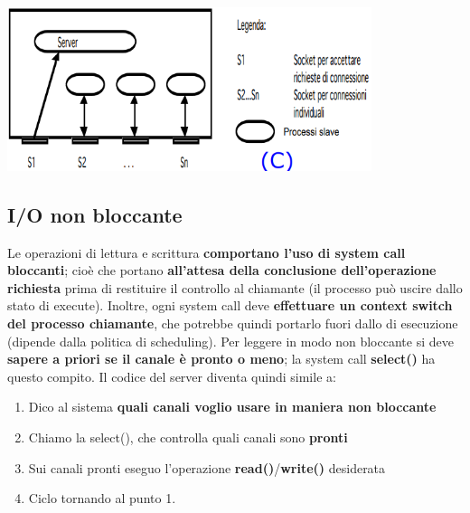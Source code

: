 \documentclass[12pt]{article}
\begin{document}
\begin{itemize}
\begin{itemize}
                    \begin{center}
                        \includegraphics[width = 0.80\textwidth]{Images/38.PNG}
                    \end{center}
          \end{itemize}
\end{itemize}
\subsection{I/O non bloccante}
Le operazioni di lettura e scrittura \textbf{comportano l'uso di system call bloccanti}; cioè che portano \textbf{all'attesa della conclusione dell'operazione richiesta} prima di restituire il controllo al chiamante (il processo può uscire dallo stato di execute). Inoltre, ogni system call deve \textbf{effettuare un context switch del processo chiamante}, che potrebbe quindi portarlo fuori dallo di esecuzione (dipende dalla politica di scheduling). Per leggere in modo non bloccante si deve \textbf{sapere a priori se il canale è pronto o meno}; la system call \textbf{select()} ha questo compito. Il codice del server diventa quindi simile a:
\begin{enumerate}
    \item Dico al sistema \textbf{quali canali voglio usare in maniera non bloccante}
    \item Chiamo la select(), che controlla quali canali sono \textbf{pronti}
    \item Sui canali pronti eseguo l'operazione \textbf{read()}/\textbf{write()} desiderata
    \item Ciclo tornando al punto 1.
\end{enumerate}
\end{document}
